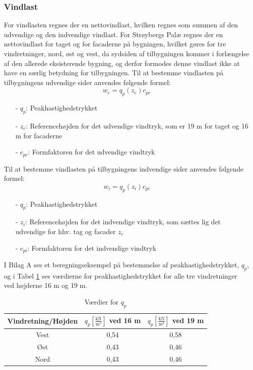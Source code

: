 \subsubsection{Vindlast}
For vindlasten regnes der en nettovindlast, hvilken regnes som summen af den udvendige og den indvendige vindlast.
\newline \indent{     }  For Strøybergs Palæ regnes der en nettovindlast for taget og for facaderne på bygningen, hvilket gøres for tre vindretninger, nord, øst og vest, da sydsiden af tilbygningen kommer i forlængelse af den allerede eksisterende bygning, og derfor formodes denne vindlast ikke at have en særlig betydning for tilbygningen.
\newline
\newline
Til at bestemme vindlasten på tilbygningens udvendige sider anvendes følgende formel:	
\begin{equation} 
	w_e = q_p(z_e)c_{pe}
\end{equation}

\begin{itemize}
	\item[-] $q_p$: Peakhastighedstrykket
	\item[-] $z_e$: Referencehøjden for det udvendige vindtryk, som er 19 m for taget og 16 m for facaderne
	\item[-] $c_{pe}$: Formfaktoren for det udvendige vindtryk
\end{itemize}

Til at bestemme vindlasten på tilbygningens indvendige sider anvendes følgende formel:
\begin{equation} 
	w_i = q_p(z_i)c_{pi}
\end{equation}
\begin{itemize}
	\item[-] $q_p$: Peakhastighedstrykket
	\item[-] $z_i$: Referencehøjden for det indvendige vindtryk, som sættes lig det udvendige for hhv. tag og facader $z_e$ \citep[ kapitel 7.2.9]{EU91}
	\item[-] $c_{pi}$: F{\tiny }ormfaktoren for det indvendige vindtryk
\end{itemize}

I Bilag A ses et beregningseksempel på bestemmelse af peakhastighedstrykket, $q_p$, og i Tabel \ref{tab:peak} ses værdierne for peakhastighedstrykket for alle tre vindretninger ved højderne 16 m og 19 m.
\begin{table}[htb]
\begin{center}
	\begin{tabular}{ c c c } 
		\hline
		Vindretning/Højden & $q_p [\frac{\text{kN}}{\text{m}^2}]$ ved 16 m & $q_p [\frac{\text{kN}}{\text{m}^2}]$ ved 19 m \\	\hline
		Vest & 0,54 & 0,58 \\	
		Øst & 0,43 & 0,46 \\
		Nord & 0,43 & 0,46 \\
	\end{tabular}
		\caption{Værdier for $q_p$}
		\label{tab:peak}
\end{center}
\end{table}

